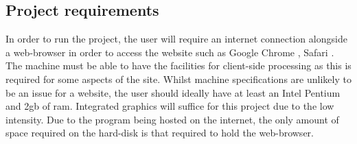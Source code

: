 \subsection{Project requirements}
In order to run the project, the user will require an internet connection alongside a web-browser in order to access the website such as Google Chrome \parencite{google}, Safari \parencite{apple}. The machine must be able to have the facilities for client-side processing as this is required for some aspects of the site. Whilst machine specifications are unlikely to be an issue for a website, the user should ideally have at least an Intel Pentium and 2gb of ram. Integrated graphics will suffice for this project due to the low intensity. Due to the program being hosted on the internet, the only amount of space required on the hard-disk is that required to hold the web-browser. 

